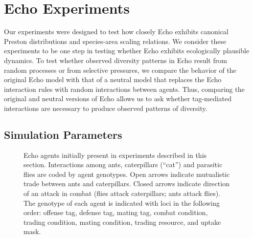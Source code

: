 \section{Echo Experiments}
\label{results}


Our experiments were designed to test how closely Echo exhibits
canonical Preston distributions and species-area scaling relations.
We consider these experiments to be one step in testing whether Echo
exhibits ecologically plausible dynamics.  
To test whether observed diversity patterns in Echo result from random
processes or from selective pressures, we compare the
behavior of the original Echo model with that of a neutral model
that replaces the Echo interaction rules with random interactions
between agents.  Thus, comparing the original and neutral versions of
Echo allows us to ask whether tag-mediated interactions are necessary
to produce observed patterns of diversity.
 
\subsection{Simulation Parameters}

\begin{figure}[t!]
\begin{center}
\leavevmode
\ifepsf
{}
\else
{}
\fi
\caption{Echo agents initially present in experiments described in
this section.  Interactions among ants, caterpillars (``cat'') and
parasitic flies are coded by agent genotypes.  Open arrows indicate
mutualistic trade between ants and caterpillars.  Closed arrows
indicate direction of an attack in combat (flies attack caterpillars;
ants attack flies).  The genotype of each agent is indicated with 
loci in the following order: offense tag, defense tag, mating tag,
combat condition, trading condition, mating condition, trading resource,
and uptake mask.
\label{fig:antcatfly}}
\end{center}
\end{figure}

